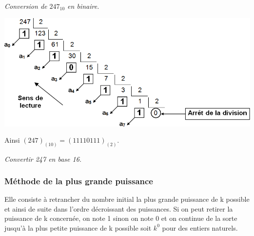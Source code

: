 \documentclass[10pt,fleqn]{article} %
\begin{document}
\begin{exemple}
\textit{Conversion de $247_{10}$ en binaire.}

\begin{center}
\includegraphics[width=.7\textwidth]{images/conversion_binaire}
\end{center}

Ainsi $(247)_{(10)}=(11110111)_{(2)}$.

\textit{Convertir 247 en base 16.}

\vspace{4cm}
\end{exemple}

\subsubsection{Méthode de la plus grande puissance}
\begin{methode}

Elle consiste à retrancher du nombre initial la plus grande puissance de k possible et ainsi de suite dans l’ordre décroissant des puissances. Si on peut retirer la puissance de k concernée, on note 1 sinon on note 0 et on continue de la sorte jusqu’à la plus petite puissance de k possible soit $k^0$ pour des entiers naturels.
\end{methode}
\end{document}

